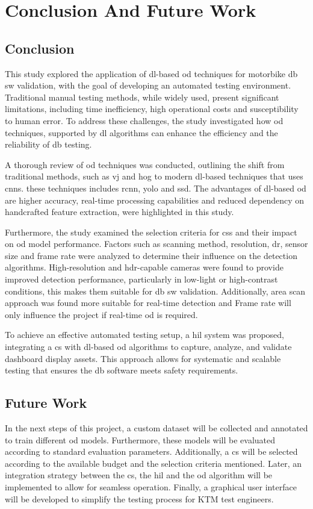 \chapter{Conclusion And Future Work}

\section{Conclusion}
This study explored the application of \gls{dl}-based \gls{od} techniques for motorbike \gls{db} \gls{sw} validation, with the goal of developing an automated testing environment. Traditional manual testing methods, while widely used, present significant limitations, including time inefficiency, high operational costs and susceptibility to human error. To address these challenges, the study investigated how \gls{od} techniques, supported by \gls{dl} algorithms can enhance the efficiency and the reliability of \gls{db} testing.

A thorough review of \gls{od} techniques was conducted, outlining the shift from traditional methods, such as \gls{vj} and \gls{hog} to modern \gls{dl}-based techniques that uses \gls{cnn}s. these techniques includes \gls{rcnn}, \gls{yolo} and \gls{ssd}. The advantages of \gls{dl}-based \gls{od} are higher accuracy, real-time processing capabilities and reduced dependency on handcrafted feature extraction, were highlighted in this study.

Furthermore, the study examined the selection criteria for \gls{cs}s and their impact on \gls{od} model performance. Factors such as scanning method, resolution, \gls{dr}, sensor size and frame rate were analyzed to determine their influence on the detection algorithms. High-resolution and \gls{hdr}-capable cameras were found to provide improved detection performance, particularly in low-light or high-contrast conditions, this makes them suitable for \gls{db} \gls{sw} validation. Additionally, area scan approach was found more suitable for real-time detection and Frame rate will only influence the project if real-time \gls{od} is required. 

To achieve an effective automated testing setup, a \gls{hil} system was proposed, integrating a \gls{cs} with \gls{dl}-based \gls{od} algorithms to capture, analyze, and validate dashboard display assets. This approach allows for systematic and scalable testing that ensures the \gls{db} software meets safety requirements.

\section{Future Work}
In the next steps of this project, a custom dataset will be collected and annotated to train different \gls{od} models. Furthermore, these models will be evaluated according to standard evaluation parameters. Additionally, a \gls{cs} will be selected according to the available budget and the selection criteria mentioned. Later, an integration strategy between the \gls{cs}, the \gls{hil} and the \gls{od} algorithm will be implemented to allow for seamless operation. Finally, a graphical user interface will be developed to simplify the testing process for KTM test engineers.